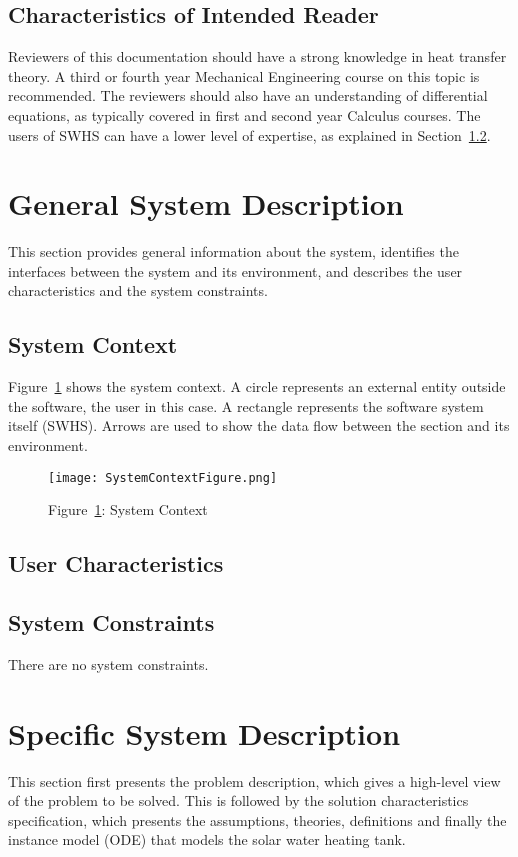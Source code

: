\documentclass[12pt]{article}
\begin{document}
\subsection{Characteristics of Intended Reader}
\label{Sec:CharofInteRead}
Reviewers of this documentation should have a strong knowledge in heat transfer theory. A third or fourth year Mechanical Engineering course on this topic is recommended. The reviewers should also have an understanding of differential equations, as typically covered in first and second year Calculus courses. The users of SWHS can have a lower level of expertise, as explained in Section~\ref{Sec:UserChar}.
\section{General System Description}
\label{Sec:GeneSystDesc}
This section provides general information about the system, identifies the interfaces between the system and its environment, and describes the user characteristics and the system constraints.
\subsection{System Context}
\label{Sec:SystCont}
Figure~\ref{Figure::SystCont} shows the system context. A circle represents an external entity outside the software, the user in this case. A rectangle represents the software system itself (SWHS). Arrows are used to show the data flow between the section and its environment.
\begin{figure}
\begin{center}
\texttt{[image: SystemContextFigure.png]}
\caption{Figure~\ref{Figure::SystCont}: System Context}
\label{Figure::SystCont}
\end{center}
\end{figure}
\subsection{User Characteristics}
\label{Sec:UserChar}
\subsection{System Constraints}
\label{Sec:SystCons}
There are no system constraints.
\section{Specific System Description}
\label{Sec:SpecSystDesc}
This section first presents the problem description, which gives a high-level view of the problem to be solved. This is followed by the solution characteristics specification, which presents the assumptions, theories, definitions and finally the instance model (ODE) that models the solar water heating tank.
\end{document}
